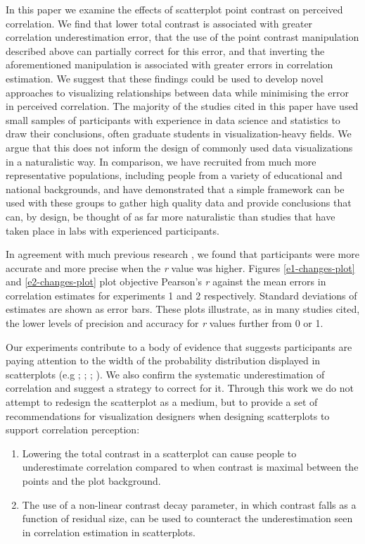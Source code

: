 \documentclass[preprint, 3p,
authoryear]{elsarticle} %
\begin{document}
In this paper we examine the effects of scatterplot point contrast on
perceived correlation. We find that lower total contrast is associated
with greater correlation underestimation error, that the use of the
point contrast manipulation described above can partially correct for
this error, and that inverting the aforementioned manipulation is
associated with greater errors in correlation estimation. We suggest
that these findings could be used to develop novel approaches to
visualizing relationships between data while minimising the error in
perceived correlation. The majority of the studies cited in this paper
have used small samples of participants with experience in data science
and statistics to draw their conclusions, often graduate students in
visualization-heavy fields. We argue that this does not inform the
design of commonly used data visualizations in a naturalistic way. In
comparison, we have recruited from much more representative populations,
including people from a variety of educational and national backgrounds,
and have demonstrated that a simple framework can be used with these
groups to gather high quality data and provide conclusions that can, by
design, be thought of as far more naturalistic than studies that have
taken place in labs with experienced participants.

In agreement with much previous research
\citep{rensink_2010, rensink_2012, rensink_2014, rensink_2017, pollack_1960},
we found that participants were more accurate and more precise when the
\emph{r} value was higher. Figures \ref{e1-changes-plot} and
\ref{e2-changes-plot} plot objective Pearson's \emph{r} against the mean
errors in correlation estimates for experiments 1 and 2 respectively.
Standard deviations of estimates are shown as error bars. These plots
illustrate, as in many studies cited, the lower levels of precision and
accuracy for \emph{r} values further from 0 or 1.

Our experiments contribute to a body of evidence that suggests
participants are paying attention to the width of the probability
distribution displayed in scatterplots (e.g \citealp{cleveland_1982};
\citealp{meyer_1997}; \citealp{yang_2019}; \citealp{rensink_2017}). We
also confirm the systematic underestimation of correlation and suggest a
strategy to correct for it. Through this work we do not attempt to
redesign the scatterplot as a medium, but to provide a set of
recommendations for visualization designers when designing scatterplots
to support correlation perception:

\begin{enumerate}
\def\labelenumi{\arabic{enumi}.}
\item
  Lowering the total contrast in a scatterplot can cause people to
  underestimate correlation compared to when contrast is maximal between
  the points and the plot background.
\item
  The use of a non-linear contrast decay parameter, in which contrast
  falls as a function of residual size, can be used to counteract the
  underestimation seen in correlation estimation in scatterplots.
\end{enumerate}
\end{document}

